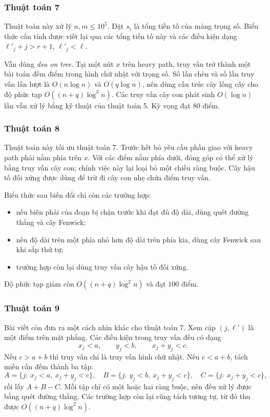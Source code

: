 \documentclass[11pt]{article}
\begin{document}
\subsubsection{Thuật toán 7}

Thuật toán này xử lý $n,m\le 10^5$. Đặt $s_i$ là tổng tiền tố của mảng trọng số.
Biểu thức cần tính được viết lại qua các tổng tiền tố này và các điều kiện dạng
$\ell'_j+j>r+1$, $\ell'_j<\ell$.

Vẫn dùng \emph{dsu on tree}. Tại một nút $x$ trên heavy path, truy vấn trở thành
một bài toán đếm điểm trong hình chữ nhật với trọng số. Số lần chèn và số lần
truy vấn lần lượt là $O(n\log n)$ và $O(q\log n)$, nên dùng cấu trúc cây lồng cây
cho độ phức tạp $O((n+q)\log^3 n)$. Các truy vấn cây con phát sinh $O(\log n)$
lần vẫn xử lý bằng kỹ thuật của thuật toán 5. Kỳ vọng đạt $80$ điểm.

\subsubsection{Thuật toán 8}

Thuật toán này tối ưu thuật toán 7. Trước hết bỏ yêu cầu phần giao với heavy path
phải nằm phía trên $x$. Với các điểm nằm phía dưới, đóng góp có thể xử lý bằng
truy vấn cây con; chính việc này lại loại bỏ một chiều ràng buộc. Cây hậu tố đối
xứng được dùng để trừ đi cây con nhẹ chứa điểm truy vấn.

Biểu thức sau biến đổi chỉ còn các trường hợp:
\begin{itemize}
  \item nếu biên phải của đoạn bị chặn trước khi đạt đủ độ dài, dùng quét đường
  thẳng và cây Fenwick;
  \item nếu độ dài trên một phía nhỏ hơn độ dài trên phía kia, dùng cây Fenwick
  sau khi sắp thứ tự;
  \item trường hợp còn lại dùng truy vấn cây hậu tố đối xứng.
\end{itemize}
Độ phức tạp giảm còn $O((n+q)\log^2 n)$ và đạt $100$ điểm.

\subsubsection{Thuật toán 9}

Bài viết còn đưa ra một cách nhìn khác cho thuật toán 7. Xem cặp $(j,\ell')$ là
một điểm trên mặt phẳng. Các điều kiện trong truy vấn đều có dạng
\[
  x_j<a,\qquad y_j<b,\qquad x_j+y_j<c.
\]
Nếu $c>a+b$ thì truy vấn chỉ là truy vấn hình chữ nhật. Nếu $c<a+b$, tách miền
cần đếm thành ba tập:
\[
  A=\{j:\ x_j<a,\ x_j+y_j<c\},\quad
  B=\{j:\ y_j<b,\ x_j+y_j<c\},\quad
  C=\{j:\ x_j+y_j<c\},
\]
rồi lấy $A+B-C$. Mỗi tập chỉ có một hoặc hai ràng buộc, nên đều xử lý được bằng
quét đường thẳng. Các trường hợp còn lại cũng tách tương tự, từ đó thu được
$O((n+q)\log^2 n)$.
\end{document}
